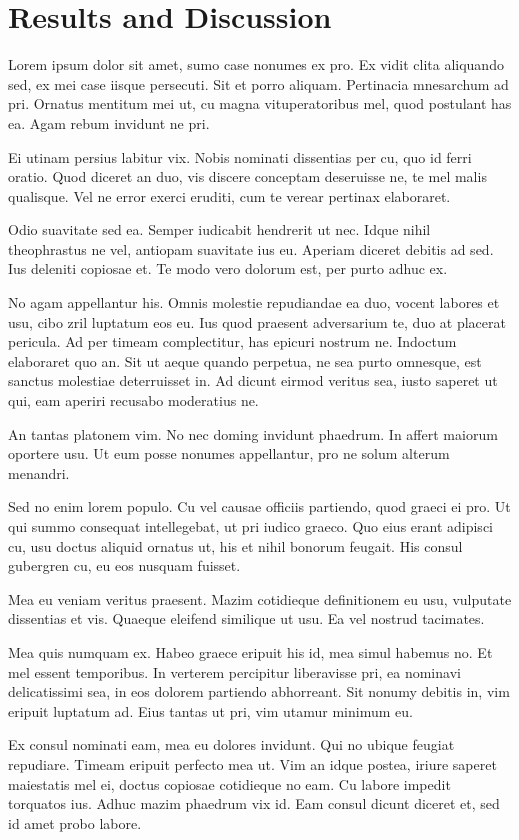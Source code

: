 \documentclass{article}
\begin{document}
\section{Results and Discussion}
Lorem ipsum dolor sit amet, sumo case nonumes ex pro. Ex vidit clita aliquando sed, ex mei case iisque persecuti. Sit et porro aliquam. Pertinacia mnesarchum ad pri. Ornatus mentitum mei ut, cu magna vituperatoribus mel, quod postulant has ea. Agam rebum invidunt ne pri.

Ei utinam persius labitur vix. Nobis nominati dissentias per cu, quo id ferri oratio. Quod diceret an duo, vis discere conceptam deseruisse ne, te mel malis qualisque. Vel ne error exerci eruditi, cum te verear pertinax elaboraret.

Odio suavitate sed ea. Semper iudicabit hendrerit ut nec. Idque nihil theophrastus ne vel, antiopam suavitate ius eu. Aperiam diceret debitis ad sed. Ius deleniti copiosae et. Te modo vero dolorum est, per purto adhuc ex.

No agam appellantur his. Omnis molestie repudiandae ea duo, vocent labores et usu, cibo zril luptatum eos eu. Ius quod praesent adversarium te, duo at placerat pericula. Ad per timeam complectitur, has epicuri nostrum ne. Indoctum elaboraret quo an. Sit ut aeque quando perpetua, ne sea purto omnesque, est sanctus molestiae deterruisset in. Ad dicunt eirmod veritus sea, iusto saperet ut qui, eam aperiri recusabo moderatius ne.

An tantas platonem vim. No nec doming invidunt phaedrum. In affert maiorum oportere usu. Ut eum posse nonumes appellantur, pro ne solum alterum menandri.

Sed no enim lorem populo. Cu vel causae officiis partiendo, quod graeci ei pro. Ut qui summo consequat intellegebat, ut pri iudico graeco. Quo eius erant adipisci cu, usu doctus aliquid ornatus ut, his et nihil bonorum feugait. His consul gubergren cu, eu eos nusquam fuisset.

Mea eu veniam veritus praesent. Mazim cotidieque definitionem eu usu, vulputate dissentias et vis. Quaeque eleifend similique ut usu. Ea vel nostrud tacimates.

Mea quis numquam ex. Habeo graece eripuit his id, mea simul habemus no. Et mel essent temporibus. In verterem percipitur liberavisse pri, ea nominavi delicatissimi sea, in eos dolorem partiendo abhorreant. Sit nonumy debitis in, vim eripuit luptatum ad. Eius tantas ut pri, vim utamur minimum eu.

Ex consul nominati eam, mea eu dolores invidunt. Qui no ubique feugiat repudiare. Timeam eripuit perfecto mea ut. Vim an idque postea, iriure saperet maiestatis mel ei, doctus copiosae cotidieque no eam. Cu labore impedit torquatos ius. Adhuc mazim phaedrum vix id. Eam consul dicunt diceret et, sed id amet probo labore.
\end{document}
